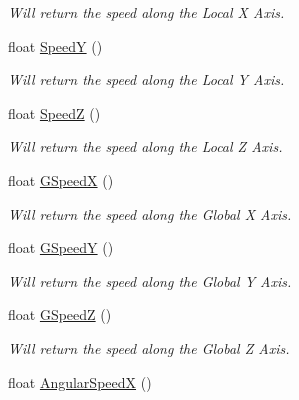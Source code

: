 \begin{DoxyCompactItemize}
\begin{DoxyCompactList}\small\item\em Will return the speed along the Local X Axis. \end{DoxyCompactList}\item 
\hypertarget{classc_momentum_a649b177cb629fce975641e69ac9df2ab}{
float \hyperlink{classc_momentum_a649b177cb629fce975641e69ac9df2ab}{SpeedY} ()}
\label{classc_momentum_a649b177cb629fce975641e69ac9df2ab}

\begin{DoxyCompactList}\small\item\em Will return the speed along the Local Y Axis. \end{DoxyCompactList}\item 
\hypertarget{classc_momentum_ab107d0a5bb3c2c935410830009455b3c}{
float \hyperlink{classc_momentum_ab107d0a5bb3c2c935410830009455b3c}{SpeedZ} ()}
\label{classc_momentum_ab107d0a5bb3c2c935410830009455b3c}

\begin{DoxyCompactList}\small\item\em Will return the speed along the Local Z Axis. \end{DoxyCompactList}\item 
\hypertarget{classc_momentum_acaad0c9e2d375a82b2cffe8ca8056acc}{
float \hyperlink{classc_momentum_acaad0c9e2d375a82b2cffe8ca8056acc}{GSpeedX} ()}
\label{classc_momentum_acaad0c9e2d375a82b2cffe8ca8056acc}

\begin{DoxyCompactList}\small\item\em Will return the speed along the Global X Axis. \end{DoxyCompactList}\item 
\hypertarget{classc_momentum_a614d9e117518e4cbcbb1caa8b2b68ccd}{
float \hyperlink{classc_momentum_a614d9e117518e4cbcbb1caa8b2b68ccd}{GSpeedY} ()}
\label{classc_momentum_a614d9e117518e4cbcbb1caa8b2b68ccd}

\begin{DoxyCompactList}\small\item\em Will return the speed along the Global Y Axis. \end{DoxyCompactList}\item 
\hypertarget{classc_momentum_a0572c183336eeb1f5d9e21bbfffb9291}{
float \hyperlink{classc_momentum_a0572c183336eeb1f5d9e21bbfffb9291}{GSpeedZ} ()}
\label{classc_momentum_a0572c183336eeb1f5d9e21bbfffb9291}

\begin{DoxyCompactList}\small\item\em Will return the speed along the Global Z Axis. \end{DoxyCompactList}\item 
\hypertarget{classc_momentum_a7feaf09a6ac800e6e5971a445323a779}{
float \hyperlink{classc_momentum_a7feaf09a6ac800e6e5971a445323a779}{AngularSpeedX} ()}
\label{classc_momentum_a7feaf09a6ac800e6e5971a445323a779}


\end{DoxyCompactItemize}
